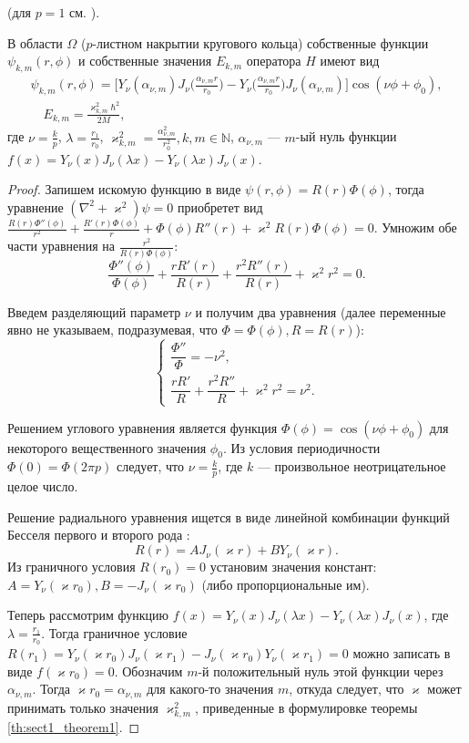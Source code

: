 \begin{theorem}{\normalfont (для $p=1$ см. \cite[с.~165.]{wref10})}.

В  области $\Omega$ ($p$-листном накрытии кругового кольца)  собственные функции $\psi_{k,m}(r,\phi)$ и собственные значения $E_{k,m}$ оператора $\hat{H}$ имеют вид
\begin{multline*}
\psi_{k,m}(r,\phi) = \biggl[ Y_\nu(\alpha_{\nu, m}) J_\nu\biggl(\frac{\alpha_{\nu, m}r}{r_0}\biggr) - Y_\nu\biggl(\frac{\alpha_{\nu, m}r}{r_0}\biggr) J_\nu(\alpha_{\nu, m}) \biggr] \cos{(\nu \phi+\phi_0)}, \\
\quad E_{k,m}= \frac{\varkappa^2_{k,m}\hbar^2}{2M},
\end{multline*}
где 
$\nu=\frac{k}{p}$,  $\lambda = \frac{r_1}{r_0}$,
$\varkappa^2_{k,m}=\frac{\alpha_{\nu, m}^2}{r_0^2},  k, m \in \mathbb{N}$, $\alpha_{\nu, m}$ --- $m$-ый нуль функции $f(x) = Y_\nu(x) J_\nu(\lambda x) - Y_\nu(\lambda x) J_\nu(x)$.
\label{th:sect1_theorem1}
\end{theorem}
\begin{proof}
Запишем искомую функцию в виде $\psi(r, \phi) = R(r)\Phi(\phi)$, тогда уравнение $(\nabla^2 + \varkappa^2)\psi = 0$ приобретет вид
$ \frac{R(r)\Phi''(\phi)}{r^2} + \frac{R'(r)\Phi(\phi)}{r} + \Phi(\phi) R''(r) +\varkappa^2R(r)\Phi(\phi) = 0$. Умножим обе части уравнения на $\frac{r^2}{R(r)\Phi(\phi)}$:
$$\frac{\Phi''(\phi)}{\Phi(\phi)} + \frac{rR'(r)}{R(r)} + \frac{r^2R''(r)}{R(r)} + \varkappa^2r^2 = 0.$$

Введем разделяющий параметр  $\nu$ и получим два уравнения (далее переменные явно не указываем, подразумевая, что $\Phi = \Phi(\phi), R=R(r)$):
\[
\left\{\begin{array}{cc}
    \dfrac{\Phi''}{\Phi} =-\nu^2, \\[10pt]
    \dfrac{rR'}{R} + \dfrac{r^2R''}{R} + \varkappa^2r^2 = \nu^2.
\end{array}
\right.
\]

Решением углового уравнения является функция $\Phi(\phi)  = \cos{(\nu \phi + \phi_0)}$ для некоторого вещественного значения $\phi_0$. Из условия периодичности $\Phi(0) = \Phi(2\pi p)$ следует, что 
$\nu = \frac{k}{p}$, где $k$ --- произвольное неотрицательное целое число. 

Решение радиального уравнения ищется в виде линейной  комбинации функций Бесселя первого и второго рода \cite[\S\ 9, с.~358]{wref2}:
$$R(r) = A J_\nu(\varkappa r) +B Y_\nu(\varkappa r).$$
Из граничного условия $R(r_0) = 0$ установим значения констант: $A = Y_\nu(\varkappa r_0), B = -J_\nu(\varkappa r_0)$ (либо пропорциональные им). 

Теперь рассмотрим функцию  $f(x)=Y_\nu(x) J_\nu(\lambda x) - Y_\nu(\lambda x) J_\nu(x)$, где $\lambda = \frac{r_1}{r_0}$.
Тогда граничное условие $R(r_1) = Y_\nu(\varkappa r_0) J_\nu(\varkappa r_1) -J_\nu(\varkappa r_0) Y_\nu(\varkappa r_1) =0$ можно записать в виде
$f(\varkappa r_0)=0$.
Обозначим $m$-й положительный нуль этой функции через $\alpha_{\nu, m}$. Тогда  $\varkappa r_0 = \alpha_{\nu, m} $ для какого-то значения $m$,
откуда следует, что $\varkappa$ может принимать только значения $\varkappa^2_{k,m}$, приведенные в формулировке теоремы \ref{th:sect1_theorem1}.
\end{proof}

